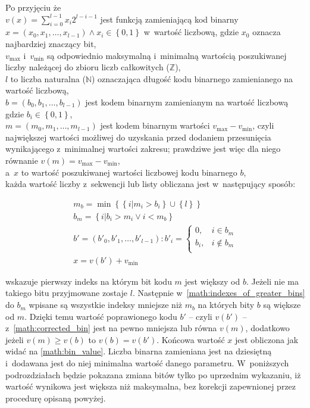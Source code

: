Po przyjęciu że\\
$
  v\left(x\right)=\sum_{i=0}^{l-1}{x_i2^{l-i-1}}
$ jest funkcją zamieniającą kod binarny $
  x=\left(x_0,x_1,\dots,x_{l-1}\right)
  \land x_i \in \left\{0,1\right\}
$ w~wartość liczbową,
  gdzie $x_0$ oznacza najbardziej znaczący bit,\\
$v_{\max}$ i~$v_{\min}$ są odpowiednio
  maksymalną i~minimalną wartością
  poszukiwanej liczby należącej do zbioru
  liczb całkowitych ($\mathbb{Z}$),\\
$l$ to liczba naturalna ($\mathbb{N}$)
  oznaczająca długość kodu binarnego
  zamienianego na wartość liczbową,\\
$b=\left(b_0, b_1, \dots, b_{l-1}\right)$ jest
  kodem binarnym zamienianym na wartość
  liczbową gdzie $b_i \in \left\{0, 1\right\}$,\\
$m=\left(m_0, m_1, \dots, m_{l-1}\right)$ jest
  kodem binarnym wartości $v_{\max}-v_{\min}$,
  czyli największej wartości możliwej do uzyskania
  przed dodaniem przesunięcia wynikającego
  z~minimalnej wartości zakresu;
  prawdziwe jest więc dla niego równanie
  $v\left(m\right)=v_{\max}-v_{\min}$,\\
a~$x$ to wartość poszukiwanej wartości
  liczbowej kodu binarnego $b$,\\
każda wartość liczby z~sekwencji lub listy
obliczana jest w~następujący sposób:
\begin{fleqn}
  \begin{gather}
    \label{math:first_greater_bin}
    m_b=\min{\left\{
      \left\{i| m_i > b_i\right\}
      \cup \left\{l\right\}
    \right\}}\\
    \label{math:indexes_of_greater_bins}
    b_m=\left\{i|b_i>m_i \lor i<m_b\right\}\\
    \label{math:corrected_bin}
    b'=\left(b'_0,b'_1,\dots,b'_{l-1}\right):
      b'_i=\begin{cases}
        0 ,& i \in b_m \\
        b_i ,& i \notin b_m \\
      \end{cases}\\
    \label{math:bin_value}
    x=v\left(b'\right)+v_{\min}
  \end{gather}
\end{fleqn}
 wskazuje pierwszy indeks
na którym bit kodu $m$ jest większy od $b$.
Jeżeli nie ma takiego bitu przyjmowane zostaje $l$.
Następnie w~\cref{math:indexes_of_greater_bins} do
$b_m$ wpisane są wszystkie indeksy mniejsze niż $m_b$
na których bity $b$ są większe od $m$.
Dzięki temu wartość poprawionego kodu $b'$
-- czyli $v\left(b'\right)$ -- z~\cref{math:corrected_bin}
jest na pewno mniejsza lub równa $v\left(m\right)$,
dodatkowo jeżeli $
  v\left(m\right) \geqslant v\left(b\right)
$ to $v\left(b\right)=v\left(b'\right)$.
Końcowa wartość $x$ jest obliczona
jak widać na \cref{math:bin_value}.
Liczba binarna zamieniana jest na dziesiętną
i~dodawana jest do niej minimalna
wartość danego parametru.
W~poniższych podrozdziałach będzie pokazana
zmiana bitów tylko po uprzednim wykazaniu,
iż wartość wynikowa jest większa niż maksymalna,
bez korekcji zapewnionej przez procedurę opisaną powyżej.

